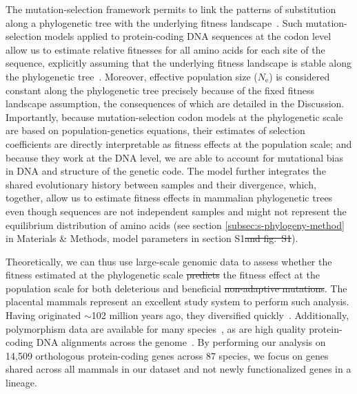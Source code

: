 \documentclass{article} %
\newcommand{\Ne}{N_{\text{e}}}
\providecommand{\DIFaddtex}[1]{{\protect\color{blue}\uwave{#1}}} %
\providecommand{\DIFdeltex}[1]{{\protect\color{red}\sout{#1}}}                      %
\providecommand{\DIFaddbegin}{} %
\providecommand{\DIFaddend}{} %
\providecommand{\DIFdelbegin}{} %
\providecommand{\DIFdelend}{} %
\providecommand{\DIFadd}[1]{\texorpdfstring{\DIFaddtex{#1}}{#1}} %
\providecommand{\DIFdel}[1]{\texorpdfstring{\DIFdeltex{#1}}{}} %
\newcommand{\DIFscaledelfig}{0.5}
\newlength{\DIFdelgraphicswidth} %
\newlength{\DIFdelgraphicsheight} %
\newcommand{\DIFaddincludegraphics}[2][]{{\color{blue}\fbox{\DIFOincludegraphics[#1]{#2}}}} %
\newcommand{\DIFdelincludegraphics}[2][]{%
\sbox{\DIFdelgraphicsbox}{\DIFOincludegraphics[#1]{#2}}%
\settoboxwidth{\DIFdelgraphicswidth}{\DIFdelgraphicsbox} %
\settoboxtotalheight{\DIFdelgraphicsheight}{\DIFdelgraphicsbox} %
\scalebox{\DIFscaledelfig}{%
\parbox[b]{\DIFdelgraphicswidth}{\usebox{\DIFdelgraphicsbox}\\[-\baselineskip] \rule{\DIFdelgraphicswidth}{0em}}\llap{\resizebox{\DIFdelgraphicswidth}{\DIFdelgraphicsheight}{%
\setlength{\unitlength}{\DIFdelgraphicswidth}%
\begin{picture}(1,1)%
\thicklines\linethickness{2pt} %
{\color[rgb]{1,0,0}\put(0,0){\framebox(1,1){}}}%
{\color[rgb]{1,0,0}\put(0,0){\line( 1,1){1}}}%
{\color[rgb]{1,0,0}\put(0,1){\line(1,-1){1}}}%
\end{picture}%
}\hspace*{3pt}}} %
} %
\DeclareRobustCommand{\DIFaddbegin}{\DIFOaddbegin \let\includegraphics\DIFaddincludegraphics} %
\DeclareRobustCommand{\DIFaddend}{\DIFOaddend \let\includegraphics\DIFOincludegraphics} %
\DeclareRobustCommand{\DIFdelbegin}{\DIFOdelbegin \let\includegraphics\DIFdelincludegraphics} %
\DeclareRobustCommand{\DIFdelend}{\DIFOaddend \let\includegraphics\DIFOincludegraphics} %
\begin{document}
    The mutation-selection framework permits to link the patterns of substitution along a phylogenetic tree with the underlying fitness landscape~\cite{halpern_evolutionary_1998, mccandlish_modeling_2014}.
    Such mutation-selection models applied to protein-coding DNA sequences at the codon level allow us to estimate relative fitnesses for all amino acids for each site of the sequence, explicitly assuming that the underlying fitness landscape is stable along the phylogenetic tree~\cite{rodrigue_mechanistic_2010, tamuri_estimating_2012, rodrigue_detecting_2017}.
    Moreover, effective population size ($\Ne$) is considered constant along the phylogenetic tree precisely because of the fixed fitness landscape assumption, the consequences of which are detailed in the Discussion.
    Importantly, because mutation-selection codon models at the phylogenetic scale are based on population-genetics equations, their estimates of selection coefficients are directly interpretable as fitness effects at the population scale; and because they work at the DNA level, we are able to account for mutational bias in DNA and structure of the genetic code.
    The model further integrates the shared evolutionary history between samples and their divergence, which, together, allow us to estimate fitness effects in mammalian phylogenetic trees even though sequences are not independent samples and might not represent the equilibrium distribution of amino acids (see section \ref{subsec:s-phylogeny-method} in Materials \& Methods, model parameters in section S1\DIFdelbegin \DIFdel{and fig.~S1}\DIFdelend ).

    Theoretically, we can thus use large-scale genomic data to assess whether the fitness estimated at the phylogenetic scale \DIFdelbegin \DIFdel{predicts }\DIFdelend \DIFaddbegin \DIFadd{predict }\DIFaddend the fitness effect at the population scale for both deleterious and beneficial \DIFdelbegin \DIFdel{non-adaptive mutations}\DIFdelend \DIFaddbegin \DIFadd{back-mutations}\DIFaddend .
    The placental mammals represent an excellent study system to perform such analysis.
    Having originated $\sim$102 million years ago, they diversified quickly~\cite{foley_genomic_2023}.
    Additionally, polymorphism data are available for many species~\cite{howe_ensembl_2021}, as are high quality protein-coding DNA alignments across the genome~\cite{ranwez_orthomam_2007, scornavacca_orthomam_2019}.
    By performing our analysis on 14,509 orthologous protein-coding genes across 87 species, we focus on genes shared across all mammals in our dataset and not newly functionalized genes in a lineage.
\end{document}
